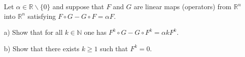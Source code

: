 Let $\alpha\in\mathbb R\backslash \{ 0 \}$ and suppose that $F$ and $G$ are linear maps (operators) from $\mathbb R^n$ into $\mathbb R^n$ satisfying $F\circ G - G\circ F=\alpha F$.

a) Show that for all $k\in\mathbb N$ one has $F^k\circ G-G\circ F^k=\alpha kF^k$.

b) Show that there exists $k\geq 1$ such that $F^k=0$.